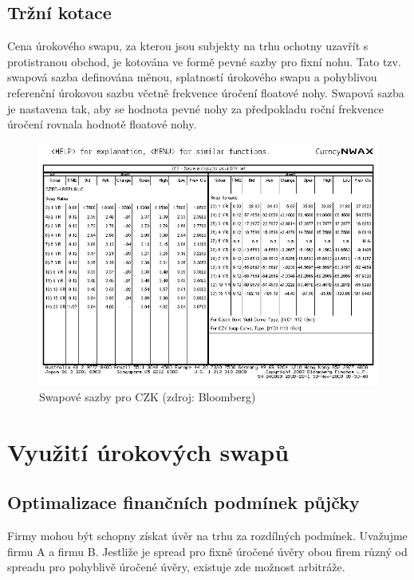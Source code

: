 \documentclass[a4paper]{book}
\begin{document}
\subsection{Tržní kotace}

Cena úrokového swapu, za kterou jsou subjekty na trhu ochotny uzavřít s protistranou obchod, je kotována ve formě pevné sazby pro fixní nohu. Tato tzv. swapová sazba definována měnou, splatností úrokového swapu a pohyblivou referenční úrokovou sazbu včetně frekvence úročení floatové nohy. Swapová sazba je nastavena tak, aby se hodnota pevné nohy za předpokladu roční frekvence úročení rovnala hodnotě floatové nohy.

\begin{figure}
  \includegraphics[bb=0 0 350 250]{irs_czk.bmp}
  \caption{Swapové sazby pro CZK (zdroj: Bloomberg)}
  \label{irs_czk}
\end{figure}

\section{Využití úrokových swapů}

\subsection{Optimalizace finančních podmínek půjčky}

Firmy mohou být schopny získat úvěr na trhu za rozdílných podmínek. Uvažujme firmu A a firmu B. Jestliže je spread pro fixně úročené úvěry obou firem různý od spreadu pro pohyblivě úročené úvěry, existuje zde možnost arbitráže.
\end{document}
